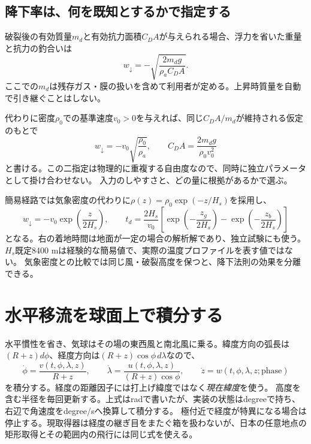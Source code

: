 \documentclass[11pt,a4paper]{article}
\begin{document}
\subsection{降下率は、何を既知とするかで指定する}
破裂後の有効質量$m_d$と有効抗力面積$C_DA$が与えられる場合、浮力を省いた重量と抗力の釣合いは
\begin{equation}
 w_\downarrow=-\sqrt{\frac{2m_dg}{\rho_a C_DA}}.
 \label{eq:descentcda}
\end{equation}
ここでの$m_d$は残存ガス・膜の扱いを含めて利用者が定める。上昇時質量を自動で引き継ぐことはしない。

代わりに密度$\rho_0$での基準速度$v_0>0$を与えれば、同じ$C_DA/m_d$が維持される仮定のもとで
\begin{equation}
 w_\downarrow=-v_0\sqrt{\frac{\rho_0}{\rho_a}},\qquad
 C_DA=\frac{2m_dg}{\rho_0v_0^2}
 \label{eq:rated}
\end{equation}
と書ける。この二指定は物理的に重複する自由度なので、同時に独立パラメータとして掛け合わせない。
入力のしやすさと、どの量に根拠があるかで選ぶ。

簡易経路では気象密度の代わりに$\rho(z)=\rho_0\exp(-z/H_s)$を採用し、
\begin{equation}
 w_\downarrow=-v_0\exp\left(\frac{z}{2H_s}\right),\qquad
 t_d=\frac{2H_s}{v_0}\left[\exp\left(-\frac{z_g}{2H_s}\right)-\exp\left(-\frac{z_b}{2H_s}\right)\right]
 \label{eq:exponential}
\end{equation}
となる。右の着地時間は地面が一定の場合の解析解であり、独立試験にも使う。
$H_s$既定8400 mは経験的な簡易値で、実際の温度プロファイルを表す値ではない。
気象密度との比較では同じ風・破裂高度を保つと、降下法則の効果を分離できる。

\section{水平移流を球面上で積分する}\label{th:horizontal}
水平慣性を省き、気球はその場の東西風と南北風に乗る。緯度方向の弧長は$(R+z)d\phi$、経度方向は$(R+z)\cos\phi\,d\lambda$なので、
\begin{equation}
 \dot\phi=\frac{v(t,\phi,\lambda,z)}{R+z},\qquad
 \dot\lambda=\frac{u(t,\phi,\lambda,z)}{(R+z)\cos\phi},\qquad
 \dot z=w(t,\phi,\lambda,z;\text{phase})
 \label{eq:flight}
\end{equation}
を積分する。経度の距離因子には打上げ緯度ではなく\emph{現在緯度}を使う。
高度を含む半径を毎回更新する。上式はradで書いたが、実装の状態はdegreeで持ち、右辺で角速度をdegree/sへ換算して積分する。
極付近で経度が特異になる場合は停止する。現取得器は経度の継ぎ目をまたぐ箱を扱わないが、日本の任意地点の矩形取得とその範囲内の飛行には同じ式を使える。
\end{document}
